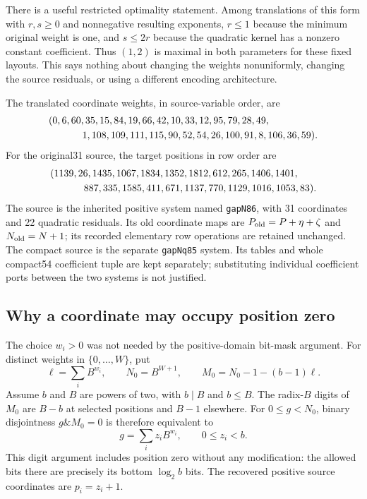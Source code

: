There is a useful restricted optimality statement.  Among translations of
this form with $r,s\ge0$ and nonnegative resulting exponents, $r\le1$
because the minimum original weight is one, and $s\le2r$ because the
quadratic kernel has a nonzero constant coefficient.  Thus $(1,2)$ is
maximal in both parameters for these fixed layouts.  This says nothing
about changing the weights nonuniformly, changing the source residuals,
or using a different encoding architecture.

The translated coordinate weights, in source-variable order, are
\[
\begin{split}
 &(0,6,60,35,15,84,19,66,42,10,33,12,95,79,28,49,\\
 &\hspace{12mm}1,108,109,111,115,90,52,54,26,100,91,8,106,36,59).
\end{split}
\]
For the original31 source, the target positions in row order are
\[
\begin{split}
 &(1139,26,1435,1067,1834,1352,1812,612,265,1406,1401,\\
 &\hspace{12mm}887,335,1585,411,671,1137,770,1129,1016,1053,83).
\end{split}
\]
The source is the inherited positive system named \texttt{gapN86}, with
31 coordinates and 22 quadratic residuals.  Its old coordinate maps are
$P_{\rm old}=P+\eta+\zeta$ and $N_{\rm old}=N+1$; its recorded elementary
row operations are retained unchanged.  The compact source is the
separate \texttt{gapNq85} system.  Its tables and whole compact54 coefficient
tuple are kept separately; substituting individual coefficient ports
between the two systems is not justified.

\subsection{Why a coordinate may occupy position zero}

The choice $w_i>0$ was not needed by the positive-domain bit-mask argument.
For distinct weights in $\{0,\ldots,W\}$, put
\[
 \ell=\sum_iB^{w_i},\qquad N_0=B^{W+1},\qquad
 M_0=N_0-1-(b-1)\ell.
\]
Assume $b$ and $B$ are powers of two, with $b\mid B$ and $b\le B$.
The radix-$B$ digits of $M_0$ are $B-b$ at selected positions and $B-1$
elsewhere.  For $0\le g<N_0$, binary disjointness $g\mathbin{\&}M_0=0$
is therefore equivalent to
\begin{equation}
 g=\sum_i z_iB^{w_i},\qquad 0\le z_i<b.
 \label{eq:origin-mask}
\end{equation}
This digit argument includes position zero without any modification: the
allowed bits there are precisely its bottom $\log_2b$ bits.  The recovered
positive source coordinates are $p_i=z_i+1$.

